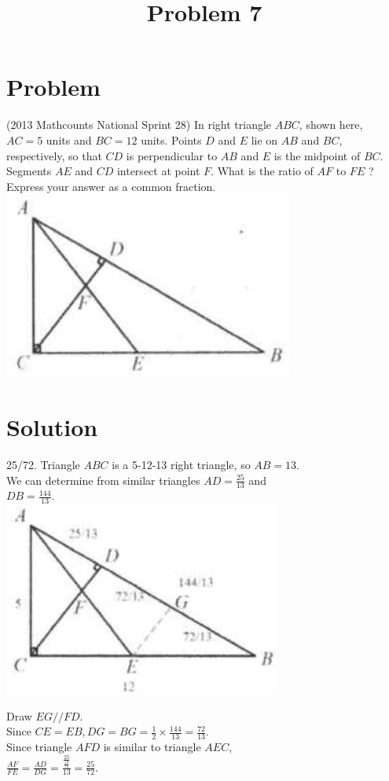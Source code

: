 \documentclass{article}
\title{Problem 7}
\date{}
\begin{document}
\maketitle

\section*{Problem}
(2013 Mathcounts National Sprint 28) In right triangle \(A B C\), shown here, \(A C=5\) units and \(B C=12\) units. Points \(D\) and \(E\) lie on \(A B\) and \(B C\), respectively, so that \(C D\) is perpendicular to \(A B\) and \(E\) is the midpoint of \(B C\). Segments \(A E\) and \(C D\) intersect at point \(F\). What is the ratio of \(A F\) to \(F E\) ? Express your answer as a common fraction.\\
\centering
\includegraphics[width=\textwidth]{images/problem_image_1.jpg}

\section*{Solution}
25/72.
Triangle \(A B C\) is a 5-12-13 right triangle, so \(A B=13\).\\
We can determine from similar triangles \(A D=\frac{25}{13}\) and\\
\(D B=\frac{144}{13}\).\\
\centering
\includegraphics[width=\textwidth]{images/reasoning_image_1.jpg}

Draw \(E G / / F D\).\\
Since \(C E=E B, D G=B G=\frac{1}{2} \times \frac{144}{13}=\frac{72}{13}\).\\
Since triangle \(A F D\) is similar to triangle \(A E C\),\\
\(\frac{A F}{F E}=\frac{A D}{D G}=\frac{\frac{25}{\frac{13}{72}}}{13}=\frac{25}{72}\).
\end{document}
